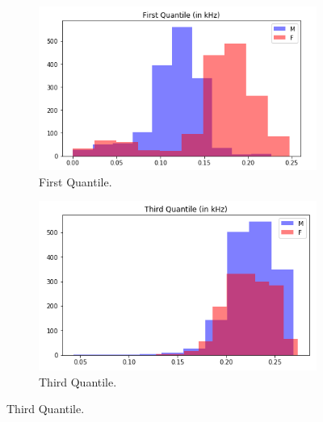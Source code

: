 \documentclass[12pt]{article}
\begin{document}
\begin{figure}[h!]
	\begin{subfigure}{0.49\linewidth}
		\centering
		\includegraphics[width=\linewidth]{images/hist_fq.png}
		\caption{First Quantile.}
		\label{fig:hist_fq}
	\end{subfigure}
	\begin{subfigure}{0.49\linewidth}
		\centering
		\includegraphics[width=\linewidth]{images/hist_tq.png}
		\caption{Third Quantile.}
		\label{fig:hist_tq}
	\end{subfigure}
	\hfill
	

\end{figure}
\end{document}
